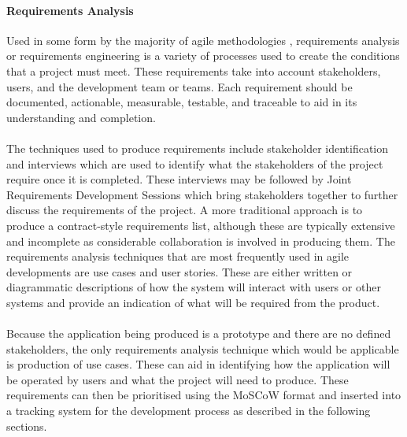 		\paragraph{Requirements Analysis}
			Used in some form by the majority of agile methodologies \citep{cao2008agile}, requirements analysis or requirements engineering is a variety of processes used to create the conditions that a project must meet. These requirements take into account stakeholders, users, and the development team or teams. Each requirement should be documented, actionable, measurable, testable, and traceable to aid in its understanding and completion.
			\\\\
			The techniques used to produce requirements include stakeholder identification and interviews which are used to identify what the stakeholders of the project require once it is completed. These interviews may be followed by Joint Requirements Development Sessions which bring stakeholders together to further discuss the requirements of the project. A more traditional approach is to produce a contract-style requirements list, although these are typically extensive and incomplete as considerable collaboration is involved in producing them. The requirements analysis techniques that are most frequently used in agile developments are use cases and user stories. These are either written or diagrammatic descriptions of how the system will interact with users or other systems and provide an indication of what will be required from the product.
			\\\\
			Because the application being produced is a prototype and there are no defined stakeholders, the only requirements analysis technique which would be applicable is production of use cases. These can aid in identifying how the application will be operated by users and what the project will need to produce. These requirements can then be prioritised using the MoSCoW format and inserted into a tracking system for the development process as described in the following sections.
